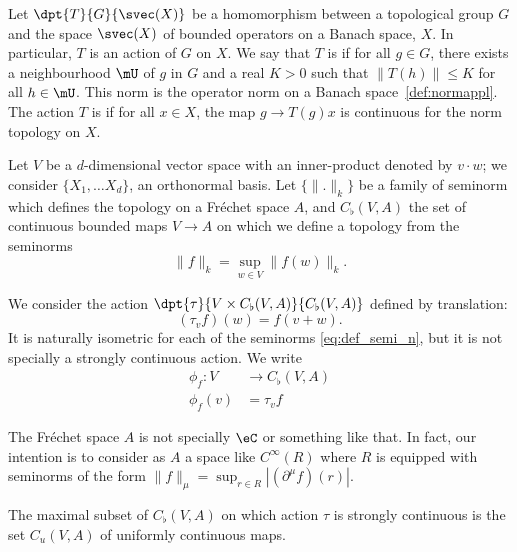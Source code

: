 Let $\dpt{T}{G}{\svec(X)}$ be a homomorphism between a topological group $G$ and the space $\svec(X)$ of bounded operators on a Banach space, $X$. In particular, $T$ is an action of $G$ on $X$. We say that $T$ is  if for all $g\in G$, there exists a neighbourhood $\mU$ of $g$ in $G$ and a real $K>0$ such that $\| T(h) \|\leq K$ for all $h\in\mU$. This norm is the operator norm on a Banach space~\ref{def:normappl}. The action $T$ is  if for all $x\in X$, the map $g\to T(g)x$ is continuous for the norm topology on $X$.

Let $V$ be a $d$-dimensional vector space with an inner-product denoted by $v\cdot w$; we consider $\{ X_1,\ldots X_d \}$, an orthonormal basis. Let $\{\| . \|_k\}$ be a family of seminorm which defines the topology on a Fréchet space $A$, and $C_{\flat}(V,A)$  the set of continuous bounded maps $V\to A$ on which we define a topology from the seminorms
\begin{equation} \label{eq:def_semi_n}
	\| f \|_k=\sup_{w\in V}\| f(w) \|_k.
\end{equation}

We consider the action $\dpt{\tau}{V\times C_{\flat}(V,A)}{C_{\flat}(V,A)}$ defined by translation:
\begin{equation} \label{eq:def_act_tau}
	(\tau_vf)(w)=f(v+w).
\end{equation}
It is naturally isometric for each of the seminorms \eqref{eq:def_semi_n}, but it is not specially a strongly continuous action. We write
\begin{equation}
	\begin{aligned}
		\phi_f\colon V & \to C_{\flat}(V,A) \\
		\phi_f(v)      & =\tau_vf
	\end{aligned}
\end{equation}

\begin{remark}
	The Fréchet space $A$ is not specially $\eC$ or something like that. In fact, our intention is to consider as $A$ a space like $ C^{\infty}(R)$ where $R$ is equipped with seminorms of the form $\| f \|_{\mu}=\sup_{r\in R}| (\partial^{\mu}f)(r) |$.
\end{remark}

\begin{proposition}
	The maximal subset of $C_{\flat}(V,A)$ on which action $\tau$ is strongly continuous is the set $C_u(V,A)$ of uniformly continuous maps.
\end{proposition}

